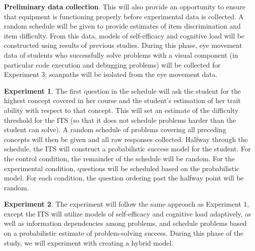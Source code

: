 \documentclass[hidelinks,11pt]{article}
\begin{document}

\textbf{Preliminary data collection}.  This will also provide an opportunity to
ensure that equipment is functioning properly before experimental data is
collected.  A random schedule will be given to provide estimates of item
discrimination and item difficulty. From this data, models of self-efficacy and
cognitive load will be constructed using results of previous studies.  During
this phase, eye movement data of students who successfully solve problems with
a visual component (in particular code execution and debugging problems) will
be collected for Experiment 3; scanpaths will be isolated from the eye movement
data. 

\textbf{Experiment 1}. The first question in the schedule will ask the student
for the highest concept covered in her course and the student’s estimation of
her trait ability with respect to that concept.  This will set an estimate of
the difficulty threshold for the ITS (so that it does not schedule problems
harder than the student can solve).  A random schedule of problems covering all
preceding concepts will then be given and all raw responses collected.  Halfway
through the schedule, the ITS will construct a probabilistic success model for
the student.  For the control condition, the remainder of the schedule will be
random.  For the experimental condition, questions will be scheduled based on
the probabilistic model.  For each condition, the question ordering past the
halfway point will be random.

\textbf{Experiment 2}. The experiment will follow the same approach as
Experiment 1, except the ITS will utilize models of self-efficacy and cognitive
load adaptively, as well as information dependencies among problems, and
schedule problems based on a probabilistic estimate of problem-solving success.
During this phase of the study, we will experiment with creating a hybrid
model. 
\end{document}
